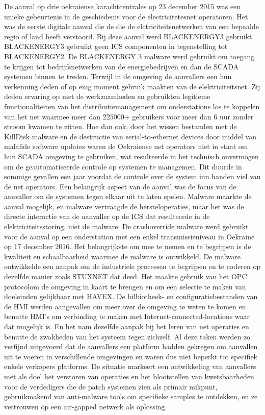 {De aanval op drie oekraiense karachtcentrales op 23 december 2015 was een unieke gebeurtenis in
de geschiedenis voor de electricitetesnet operatoren. Het was de eerste digitale aanval die de die de
elctriciteitsnetwerken van een bepaalde regio of land heeft verstoord. Bij deze aanval werd
BLACKENERGY3 gebruikt. BLACKENERGY3 gebruikt geen ICS componenten in tegenstelling tot
BLACKENERGY2. De BLACKENERGY 3 malware werd gebruikt om toegang te krijgen tot
bedrijfsnetwerken van de energiebedrijven en dan de SCADA systemen binnen te treden. Terwijl in
de omgeving de aanvallers een hun verkenning deden of op enig moment gebruik maakten van de
elektriciteitsnet. Zij deden ervaring op met de werkzaamheden en gebruikten legitieme
functionaliteiten van het distributiemanagement om onderstations los te koppelen van het net
waarmee meer dan 225000+ gebruikers voor meer dan 6 uur zonder stroom kwamen te zitten. Hoe
dan ook, door het wissen bestanden met de KillDisk malware en de destructie van serial-to-ethernet
devices door middel van malafide software updates waren de Oekraiense net operators niet in staat
om hun SCADA omgeving te gebruiken, wat resulteerde in het technisch onvermogen om de
geautomatiseerde controle op systemen te managemen. Dit duurde in sommige gevallen een jaar
voordat de controle over de system iun handen viel van de net operators. Een belangrijk aspect van
de aanval was de focus van de aanvaller om de systemen tegen elkaar uit te laten spelen. Malware
maarkte de aanval mogelijk, en malware vertraagde de hersteloperaties, maar het was de directe
interactie van de aanvaller op de ICS dat resulteerde in de elektriciteitsstoring, niet de malware.
De crashoverride malware werd gebruikt voor de aanval op een onderstation met een enkel
transmissieniveau in Oekraine op 17 december 2016. Het belangrijkste om mee te nemen en te
begrijpen is de kwaliteit en schaalbaarheid waarmee de malware is ontwikkeld. De malware
ontwikkelde een aanpak om de industriele processen te begrijpen en te coderen op dezelfde manier
zoals STUXNET dat deed. Het maakte gebruik van het OPC protocolom de omgeving in kaart te
brengen en om een selectie te maken van doeleinden gelijkbaar met HAVEX. De bilbiotheek- en
configuratiebestanden van de HMI werden aangevallen om meer over de omgeving te weten te
komen en benutte HMI’s om verbinding te maken met Internet-connected-locations waar dat
mogelijk is. En het nam dezelfde aanpak bij het leren van net operaties en benutte de zwakheden van
het systeem tegen zichzelf. Al deze taken werden zo verfijnd uitgevoerd dat de aanvallers een
platform hadden gekregen om aanvallen uit te voeren in verschillende omgevingen en waren dus
niet beperkt tot specifiek enkele verkopers platforms. De situatie markeert een ontwikkeling van
aanvallers met als doel het verstoren van operaties en het blootstellen van kwetsbaarheden voor de
verdedigers die de patch systemen zien als primair mikpunt, gebruikmakend van anti-malware tools
om specifieke samples te ontdekken, en ze vertrouwen op een air-gapped netwerk als oplossing.

}
